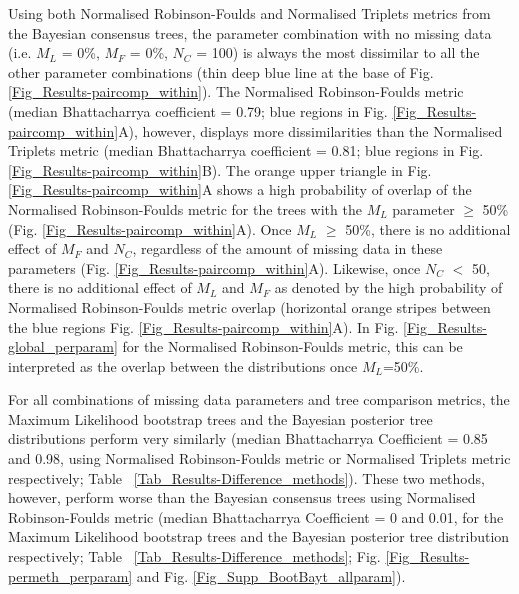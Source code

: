 Using both Normalised Robinson-Foulds and Normalised Triplets metrics from the Bayesian consensus trees, the parameter combination with no missing data (i.e. $M_{L}$ = 0\%, $M_{F}$ = 0\%, $N_{C}$ = 100) is always the most dissimilar to all the other parameter combinations (thin deep blue line at the base of Fig. \ref{Fig_Results-paircomp_within}).
The Normalised Robinson-Foulds metric (median Bhattacharrya coefficient = 0.79; blue regions in Fig. \ref{Fig_Results-paircomp_within}A), however, displays more dissimilarities than the Normalised Triplets metric (median Bhattacharrya coefficient = 0.81; blue regions in Fig. \ref{Fig_Results-paircomp_within}B).
The orange upper triangle in Fig. \ref{Fig_Results-paircomp_within}A shows a high probability of overlap of the Normalised Robinson-Foulds metric for the trees with the $M_{L}$ parameter $\geq$ 50\% (Fig. \ref{Fig_Results-paircomp_within}A).
Once $M_{L}$ $\geq$ 50\%, there is no additional effect of $M_{F}$ and $N_{C}$, regardless of the amount of missing data in these parameters (Fig. \ref{Fig_Results-paircomp_within}A).
Likewise, once $N_{C}$ $<$ 50, there is no additional effect of $M_{L}$ and $M_{F}$ as denoted by the high probability of Normalised Robinson-Foulds metric overlap (horizontal orange stripes between the blue regions Fig. \ref{Fig_Results-paircomp_within}A).
In Fig. \ref{Fig_Results-global_perparam} for the Normalised Robinson-Foulds metric, this can be interpreted as the overlap between the distributions once $M_L$=50\%.

For all combinations of missing data parameters and tree comparison metrics, the Maximum Likelihood bootstrap trees and the Bayesian posterior tree distributions perform very similarly (median Bhattacharrya Coefficient = 0.85 and 0.98, using Normalised Robinson-Foulds metric or Normalised Triplets metric respectively; Table ~\ref{Tab_Results-Difference_methods}).
These two methods, however, perform worse than the Bayesian consensus trees using Normalised Robinson-Foulds metric (median Bhattacharrya Coefficient = 0 and 0.01, for the Maximum Likelihood bootstrap trees and the Bayesian posterior tree distribution respectively; Table ~\ref{Tab_Results-Difference_methods}; Fig. \ref{Fig_Results-permeth_perparam} and Fig. \ref{Fig_Supp_BootBayt_allparam}).

